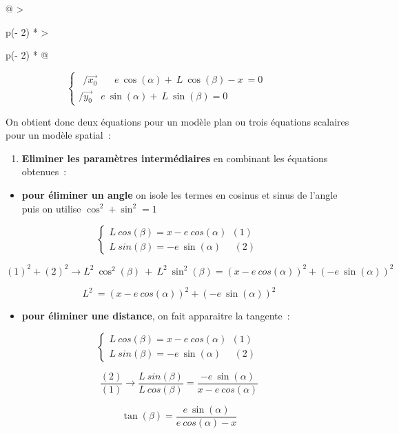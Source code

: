 \begin{longtable}[]{@{}
  >{\raggedright\arraybackslash}p{(\columnwidth - 2\tabcolsep) * }
  >{\raggedright\arraybackslash}p{(\columnwidth - 2\tabcolsep) * }@{}}
\begin{minipage}[b]{\linewidth}
\[\left\{ \begin{array}{r}
\ \ /\overrightarrow{x_{0}}\ \ \ \ \ \ \ \ e\ \cos(\alpha) + \ L\ \cos(\beta) - x\  = 0 \\
/\overrightarrow{y_{0}}\ \ \ \ e\ \sin(\alpha) + \ L\ \sin(\beta) = 0
\end{array} \right.\ \ \ \ \ \ \ \ \ \ \ \ \]

On obtient donc deux équations pour un modèle plan ou trois équations
scalaires pour un modèle spatial~:

\begin{enumerate}
\def\labelenumi{\arabic{enumi}.}
\setcounter{enumi}{3}
\item
  \textbf{Eliminer les paramètres intermédiaires} en combinant les
  équations obtenues~:
\end{enumerate}

\begin{itemize}
\item
  \textbf{pour éliminer un angle} on isole les termes en cosinus et
  sinus de l'angle puis on utilise \(\cos^{2} + \sin^{2} = 1\)
\end{itemize}

\[\left\{ \begin{array}{r}
L\ cos(\beta) = x - {e\ cos}{(\alpha)\ \ (1)} \\
L\ sin(\beta) = - e\ \sin(\alpha)\ \ \ \ \ \ (2)
\end{array} \right.\ \]

\[{(1)}^{2} + {(2)}^{2} \rightarrow L^{2}\ \cos^{2}(\beta)\  + \ L^{2}\ \sin^{2}(\beta) = \left( x - {e\ cos}(\alpha) \right)^{2} + \left( - e\ \sin(\alpha) \right)^{2}\]

\[L^{2}\  = \left( x - {e\ cos}(\alpha) \right)^{2} + \left( - e\ \sin(\alpha) \right)^{2}\]

\begin{itemize}
\item
  \textbf{pour éliminer une distance}, on fait apparaitre la tangente~:
\end{itemize}

\[\left\{ \begin{array}{r}
L\ cos(\beta) = x - {e\ cos}{(\alpha)\ \ (1)} \\
L\ sin(\beta) = - e\ \sin(\alpha)\ \ \ \ \ \ (2)
\end{array} \right.\ \]

\[\frac{(2)}{(1)} \rightarrow \frac{L\ sin(\beta)}{L\ cos(\beta)} = \frac{- e\ \sin(\alpha)}{x - {e\ cos}(\alpha)}\]

\[\tan(\beta) = \frac{e\ \sin(\alpha)}{{e\ cos}{(\alpha) - x}}\]
\end{minipage} \\
\midrule\noalign{}
\endhead
\bottomrule\noalign{}
\endlastfoot
\end{longtable}

